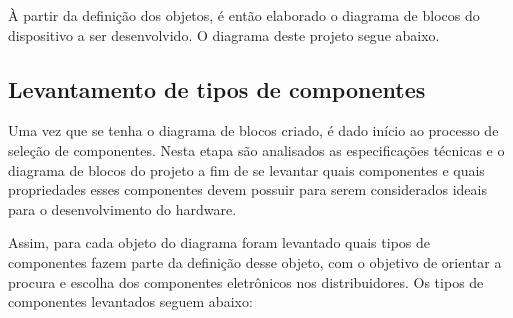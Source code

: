 À partir da definição dos objetos, é então elaborado o diagrama de blocos do dispositivo a ser desenvolvido. O diagrama deste projeto segue abaixo.

    \begin{figure}[h!]
            \captionsetup{width=16cm}
   \end{figure}

\subsection{Levantamento de tipos de componentes}\label{subsec:levantamento_tipos}


Uma vez que se tenha o diagrama de blocos criado, é dado início ao processo de seleção de componentes. Nesta etapa são analisados as especificações técnicas e o diagrama de blocos do projeto a fim de se levantar quais componentes e quais propriedades esses componentes devem possuir para serem considerados ideais para o desenvolvimento do hardware. 

Assim, para cada objeto do diagrama foram levantado quais tipos de componentes fazem parte da definição desse objeto, com o objetivo de orientar a procura e escolha dos componentes eletrônicos nos distribuidores. Os tipos de componentes levantados seguem abaixo: 

